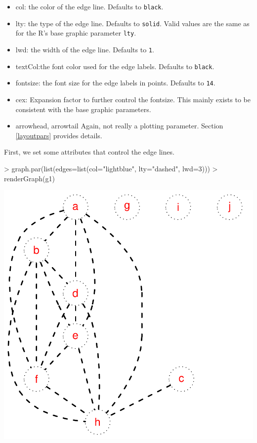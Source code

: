 \documentclass{article}
\newcommand{\Robject}[1]{{\texttt{#1}}}
\begin{document}
\begin{itemize}
\item{col:} {the color of the edge line. Defaults to \Robject{black}.}
\item{lty:} {the type of the edge line. Defaults to
  \Robject{solid}. Valid values are the same as for the R's base
  graphic parameter \Robject{lty}.}
\item{lwd:} {the width of the edge line. Defaults to \Robject{1}.}
\item{textCol:}{the font color used for the edge labels. Defaults to
  \Robject{black}.}
\item{fontsize:} {the font size for the edge labels in points. Defaults
  to \Robject{14}.}
\item{cex:} {Expansion factor to further control the fontsize. This
  mainly exists to be consistent with the base graphic parameters.}
\item{arrowhead, arrowtail} {Again, not really a plotting
    parameter. Section \ref{layoutpars} provides details. }
\end{itemize}

First, we set some attributes that control the edge lines.
\begin{Schunk}
\begin{Sinput}
> graph.par(list(edges=list(col="lightblue", lty="dashed", lwd=3)))
> renderGraph(g1)
\end{Sinput}
\end{Schunk}
\includegraphics{newRgraphvizInterface-edgepardefs}
\end{document}
